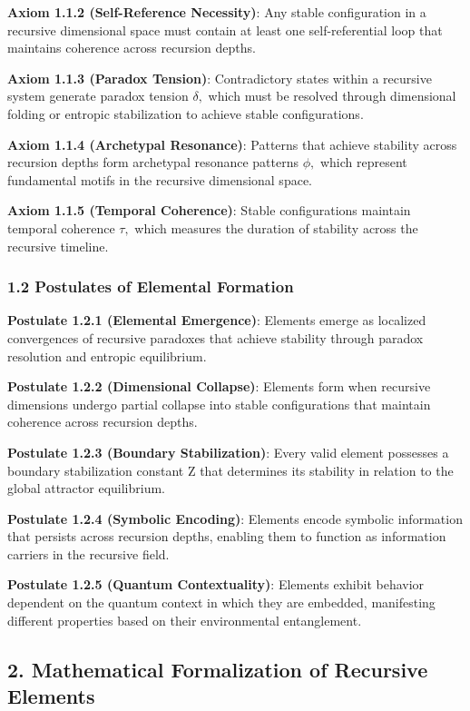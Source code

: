 \documentclass[
]{article}
\begin{document}
\textbf{Axiom 1.1.2 (Self-Reference Necessity)}: Any stable
configuration in a recursive dimensional space must contain at least one
self-referential loop that maintains coherence across recursion depths.

\textbf{Axiom 1.1.3 (Paradox Tension)}: Contradictory states within a
recursive system generate paradox tension \(\delta ,\) which must be
resolved through dimensional folding or entropic stabilization to
achieve stable configurations.

\textbf{Axiom 1.1.4 (Archetypal Resonance)}: Patterns that achieve
stability across recursion depths form archetypal resonance patterns
\(\phi ,\) which represent fundamental motifs in the recursive
dimensional space.

\textbf{Axiom 1.1.5 (Temporal Coherence)}: Stable configurations
maintain temporal coherence \(\tau ,\) which measures the duration of
stability across the recursive timeline.

\subsubsection{1.2 Postulates of Elemental
Formation}\label{postulates-of-elemental-formation}

\textbf{Postulate 1.2.1 (Elemental Emergence)}: Elements emerge as
localized convergences of recursive paradoxes that achieve stability
through paradox resolution and entropic equilibrium.

\textbf{Postulate 1.2.2 (Dimensional Collapse)}: Elements form when
recursive dimensions undergo partial collapse into stable configurations
that maintain coherence across recursion depths.

\textbf{Postulate 1.2.3 (Boundary Stabilization)}: Every valid element
possesses a boundary stabilization constant Z that determines its
stability in relation to the global attractor equilibrium.

\textbf{Postulate 1.2.4 (Symbolic Encoding)}: Elements encode symbolic
information that persists across recursion depths, enabling them to
function as information carriers in the recursive field.

\textbf{Postulate 1.2.5 (Quantum Contextuality)}: Elements exhibit
behavior dependent on the quantum context in which they are embedded,
manifesting different properties based on their environmental
entanglement.

\subsection{2. Mathematical Formalization of Recursive
Elements}\label{mathematical-formalization-of-recursive-elements}
\end{document}
